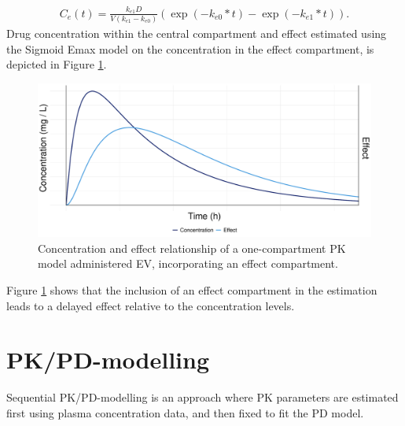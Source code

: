 \begin{align*}
    C_e(t) = \frac{k_{e1} D}{V(k_{e1} - k_{e0})} \left( \exp(-k_{e0} * t) - \exp(-k_{e1} * t) \right).
\end{align*}
Drug concentration within the central compartment and effect estimated using the Sigmoid Emax model on the concentration in the effect compartment, is depicted in Figure \ref{fig: PKPDmodel}.
\begin{figure}[H]
    \centering
    \includegraphics[width=0.95\linewidth]{fig/img/PD/PK-PDmodel.pdf}
    \caption{Concentration and effect relationship of a one-compartment PK model administered EV, incorporating an effect compartment.}
    \label{fig: PKPDmodel}
\end{figure}
Figure \ref{fig: PKPDmodel} shows that the inclusion of an effect compartment in the estimation leads to a delayed effect relative to the concentration levels. \citep{f11a2bf72b3e4305be6ebfffc456fc23}

\section{PK/PD-modelling} \label{sec: PK/PD-modelling}

Sequential PK/PD-modelling is an approach where PK parameters are estimated first using plasma concentration data, and then fixed to fit the PD model.

